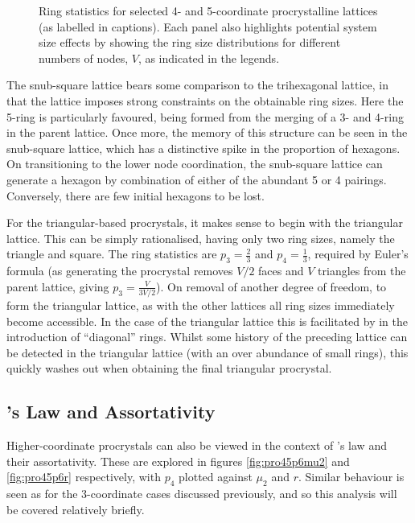 \begin{figure}[bt]
     \caption{Ring statistics for selected 4\-- and 5\--coordinate procrystalline lattices (as labelled in captions). Each panel also highlights potential system size effects by showing the ring size distributions for different numbers of nodes, $V$, as indicated in the legends.}
     \label{fig:pro45pk}
\end{figure}

The snub\--square lattice bears some comparison to the trihexagonal lattice, in that the lattice imposes strong constraints on the obtainable ring sizes.
Here the 5\--ring is particularly favoured, being formed from the merging of a 3\-- and 4\--ring in the parent lattice.
Once more, the memory of this structure can be seen in the snub\--square lattice, which has a distinctive spike in the proportion of hexagons.
On transitioning to the lower node coordination, the snub\--square lattice can generate a hexagon by combination of either of the abundant 5 or 4 pairings.
Conversely, there are few initial hexagons to be lost.

For the triangular\--based procrystals, it makes sense to begin with the triangular lattice.
This can be simply rationalised, having only two ring sizes, namely the triangle and square.
The ring statistics are $p_3=\frac{2}{3}$ and $p_4=\frac{1}{3}$, required by Euler's formula (as generating the procrystal removes $V/2$ faces and $V$ triangles from the parent lattice, giving $p_3=\frac{V}{3V/2}$).
On removal of another degree of freedom, to form the triangular lattice, as with the other lattices all ring sizes immediately become accessible.
In the case of the triangular lattice this is facilitated by in the introduction of ``diagonal'' rings.
Whilst some history of the preceding lattice can be detected in the triangular lattice (with an over abundance of small rings), this quickly washes out when obtaining the final triangular procrystal.

\subsection{\lm's Law and Assortativity}

Higher\--coordinate procrystals can also be viewed in the context of \lm's law and their assortativity.
These are explored in figures \ref{fig:pro45p6mu2} and \ref{fig:pro45p6r} respectively, with $p_4$ plotted against $\mu_2$ and $r$.
Similar behaviour is seen as for the 3\--coordinate cases discussed previously, and so this analysis will be covered relatively briefly.

